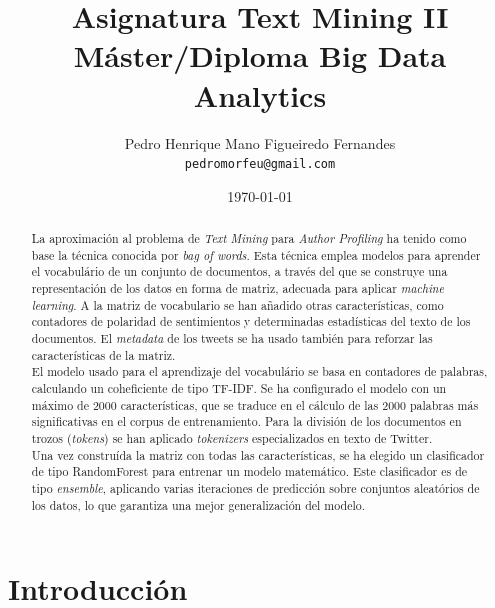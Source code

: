 \documentclass[11pt,a4paper]{article}
\title{Asignatura Text Mining II\\
M\'aster/Diploma Big Data Analytics}
\author{Pedro Henrique Mano Figueiredo Fernandes \\
  {\tt pedromorfeu@gmail.com} \\}
\date{\today}
\begin{document}
\maketitle
\begin{abstract}
  
  \indent La aproximaci\'on al problema de {\em Text Mining} para {\em Author Profiling} ha tenido como base la t\'ecnica conocida por {\em bag of words}. Esta t\'ecnica emplea modelos para aprender el vocabul\'ario de un conjunto de documentos, a trav\'es del que se construye una representaci\'on de los datos en forma de matriz, adecuada para aplicar {\em machine learning}. A la matriz de vocabulario se han a\~nadido otras caracter\'isticas, como contadores de polaridad de sentimientos y determinadas estad\'isticas del texto de los documentos. El {\em metadata} de los tweets se ha usado también para reforzar las caracter\'isticas de la matriz.\\
  \indent El modelo usado para el aprendizaje del vocabul\'ario se basa en contadores de palabras, calculando un coheficiente de tipo TF-IDF. Se ha configurado el modelo con un máximo de 2000 caracter\'isticas, que se traduce en el c\'alculo de las 2000 palabras más significativas en el corpus de entrenamiento. Para la divisi\'on de los documentos en trozos ({\em tokens}) se han aplicado {\em tokenizers} especializados en texto de Twitter.\\
  \indent Una vez constru\'ida la matriz con todas las caracter\'isticas, se ha elegido un clasificador de tipo RandomForest para entrenar un modelo matem\'atico. Este clasificador es de tipo {\em ensemble}, aplicando varias iteraciones de predicci\'on sobre conjuntos aleat\'orios de los datos, lo que garantiza una mejor generalizaci\'on del modelo.

\end{abstract}


\section{Introducci\'on}
\end{document}
